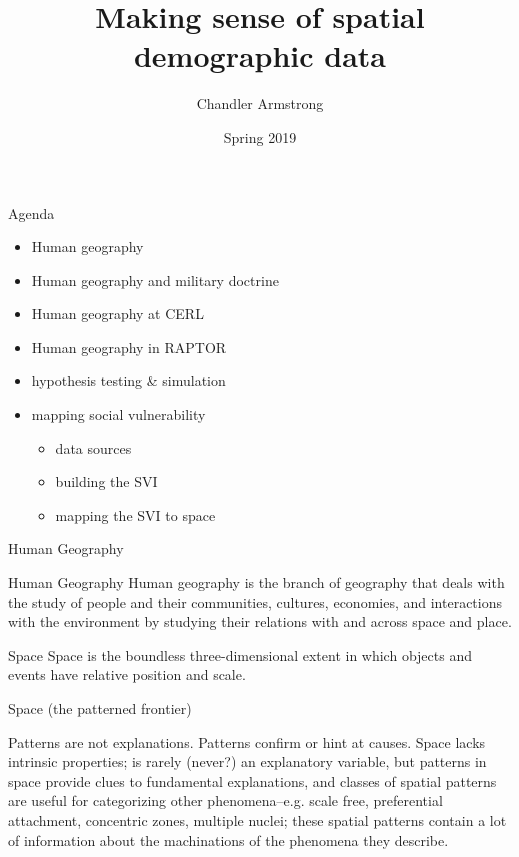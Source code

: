 \documentclass{beamer}
\title{Making sense of spatial demographic data}
\subtitle{}
\author{Chandler Armstrong}
\institute{CERL}
\date{Spring 2019}
\begin{document}
\begin{frame}
\titlepage
\end{frame}


\begin{frame}{Agenda}
  \begin{itemize}
  \item Human geography
  \item Human geography and military doctrine
  \item Human geography at CERL
  \item Human geography in RAPTOR
  \item hypothesis testing \& simulation
  \item mapping social vulnerability
    \begin{itemize}
    \item data sources
    \item building the SVI
    \item mapping the SVI to space
    \end{itemize}
  \end{itemize}
  \nocite{gotway97}
\end{frame}


\begin{frame}{Human Geography}
  \begin{definition}{Human Geography}
    Human geography is the branch of geography that deals with the study of people and their communities, cultures, economies, and interactions with the environment by studying their relations with and across space and place.
  \end{definition}
  \begin{definition}{Space}
    Space is the boundless three-dimensional extent in which objects and events have relative position and scale.
  \end{definition}
\end{frame}


\begin{frame}{Space (the patterned frontier)}
  \begin{corollary}
    Patterns are not explanations.  Patterns confirm or hint at causes.  Space lacks intrinsic properties; is rarely (never?) an explanatory variable, but patterns in space provide clues to fundamental explanations, and classes of spatial patterns are useful for categorizing other phenomena--e.g. scale free, preferential attachment, concentric zones, multiple nuclei; these spatial patterns contain a lot of information about the machinations of the phenomena they describe.
  \end{corollary}
\end{frame}
\end{document}
